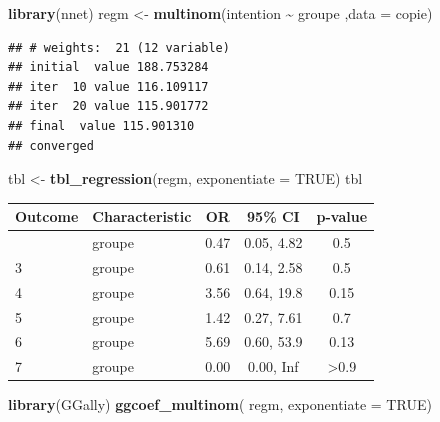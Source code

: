 \documentclass[
]{article}
\newenvironment{Shaded}{\begin{snugshade}}{\end{snugshade}}
\newcommand{\AttributeTok}[1]{\textcolor[rgb]{0.13,0.29,0.53}{#1}}
\newcommand{\ConstantTok}[1]{\textcolor[rgb]{0.56,0.35,0.01}{#1}}
\newcommand{\FunctionTok}[1]{\textcolor[rgb]{0.13,0.29,0.53}{\textbf{#1}}}
\newcommand{\NormalTok}[1]{#1}
\newcommand{\OtherTok}[1]{\textcolor[rgb]{0.56,0.35,0.01}{#1}}
\newcommand{\SpecialCharTok}[1]{\textcolor[rgb]{0.81,0.36,0.00}{\textbf{#1}}}
\begin{document}
\begin{Shaded}
\begin{Highlighting}[]
\FunctionTok{library}\NormalTok{(nnet)}
\NormalTok{regm }\OtherTok{\textless{}{-}} \FunctionTok{multinom}\NormalTok{(intention }\SpecialCharTok{\textasciitilde{}}\NormalTok{ groupe ,}\AttributeTok{data =}\NormalTok{ copie)}
\end{Highlighting}
\end{Shaded}

\begin{verbatim}
## # weights:  21 (12 variable)
## initial  value 188.753284 
## iter  10 value 116.109117
## iter  20 value 115.901772
## final  value 115.901310 
## converged
\end{verbatim}

\begin{Shaded}
\begin{Highlighting}[]
\NormalTok{tbl }\OtherTok{\textless{}{-}} \FunctionTok{tbl\_regression}\NormalTok{(regm, }\AttributeTok{exponentiate =} \ConstantTok{TRUE}\NormalTok{)}
\NormalTok{tbl}
\end{Highlighting}
\end{Shaded}

\begin{longtable}[]{@{}llccc@{}}
\toprule\noalign{}
\textbf{Outcome} & \textbf{Characteristic} & \textbf{OR} & \textbf{95\%
CI} & \textbf{p-value} \\
\midrule\noalign{}
\endhead
\bottomrule\noalign{}
\endlastfoot
2 & groupe & 0.47 & 0.05, 4.82 & 0.5 \\
3 & groupe & 0.61 & 0.14, 2.58 & 0.5 \\
4 & groupe & 3.56 & 0.64, 19.8 & 0.15 \\
5 & groupe & 1.42 & 0.27, 7.61 & 0.7 \\
6 & groupe & 5.69 & 0.60, 53.9 & 0.13 \\
7 & groupe & 0.00 & 0.00, Inf & \textgreater0.9 \\
\end{longtable}

\begin{Shaded}
\begin{Highlighting}[]
\FunctionTok{library}\NormalTok{(GGally)}
\FunctionTok{ggcoef\_multinom}\NormalTok{(}
\NormalTok{  regm,}
  \AttributeTok{exponentiate =} \ConstantTok{TRUE}\NormalTok{)}
\end{Highlighting}
\end{Shaded}
\end{document}
